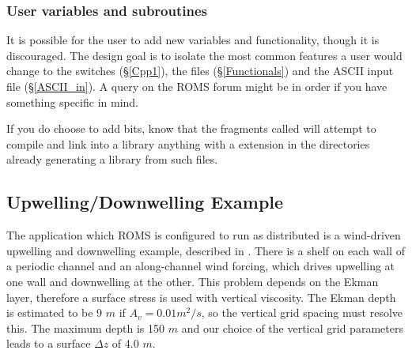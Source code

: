 
\subsubsection{User variables and subroutines}
\label{Store}
It is possible for the user to add new variables and functionality,
though it is discouraged. The design goal is to isolate the most common
features a user would change to the  switches
(\S\ref{Cpp1}), the  files (\S\ref{Functionals}) and
the ASCII input file (\S\ref{ASCII_in}). A query on the ROMS forum
might be in order if you have something specific in mind.

If you do choose to add bits, know that the 
fragments called  will attempt to compile and
link into a library anything
with a  extension in the directories already generating a
library from such files.

\subsection{Upwelling/Downwelling Example}
\label{UpDown}
The application which ROMS is configured to run as distributed
is a wind-driven
upwelling and downwelling example, described in
\cite{Macks93}.  There is a shelf on each wall of a periodic channel
and an along-channel wind forcing, which drives upwelling at one wall
and downwelling at the other.  This problem depends on the Ekman layer,
therefore a surface stress is used with vertical viscosity.  The Ekman
depth is estimated to be 9 $m$ if $A_v = 0.01 m^2 / s$, so the vertical
grid spacing must resolve this.  The maximum depth is 150 $m$ and our
choice of the vertical grid parameters leads to a surface $\Delta z$
of 4.0 $m$.

